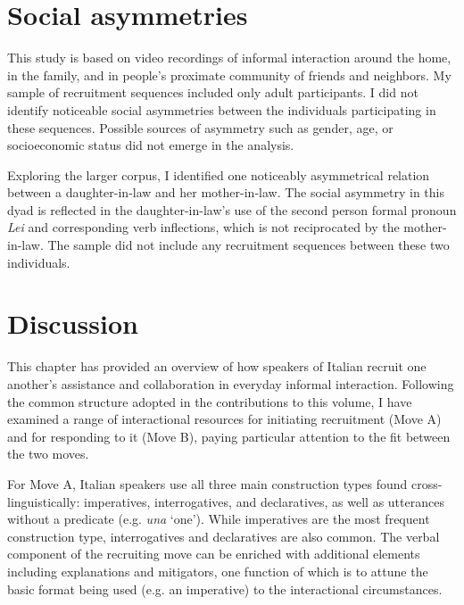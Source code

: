 \documentclass[output=paper,modfonts]{langscibook}
\begin{document}
\section{Social asymmetries}\label{sec:rossi:6}

This study is based on video recordings of informal interaction around the home, in the family, and in people's proximate community of friends and neighbors. My sample of recruitment sequences included only adult participants. I did not identify noticeable social asymmetries between the individuals participating in these sequences. Possible sources of asymmetry such as gender, age, or socioeconomic status did not emerge in the analysis. 

Exploring the larger corpus, I identified one noticeably asymmetrical relation between a daughter-in-law and her mother-in-law. The social asymmetry in this dyad is reflected in the daughter-in-law's use of the second person formal pronoun \textit{Lei} and corresponding verb inflections, which is not reciprocated by the mother-in-law. The sample did not include any recruitment sequences between these two individuals.

\section{Discussion}\label{sec:rossi:7}
This chapter has provided an overview of how speakers of Italian recruit one another's assistance and collaboration in everyday informal interaction. Following the common structure adopted in the contributions to this volume, I have examined a range of interactional resources for initiating recruitment (Move A) and for responding to it (Move B), paying particular attention to the fit between the two moves.

For Move A, Italian speakers use all three main construction types found cross-linguistically: imperatives, interrogatives, and declaratives, as well as utterances without a predicate (e.g. \textit{una} ‘one’). While imperatives are the most frequent construction type, interrogatives and declaratives are also common. %
The verbal component of the recruiting move can be enriched with additional elements including explanations and mitigators, one function of which is to attune the basic format being used (e.g. an imperative) to the interactional circumstances. %
\end{document}
